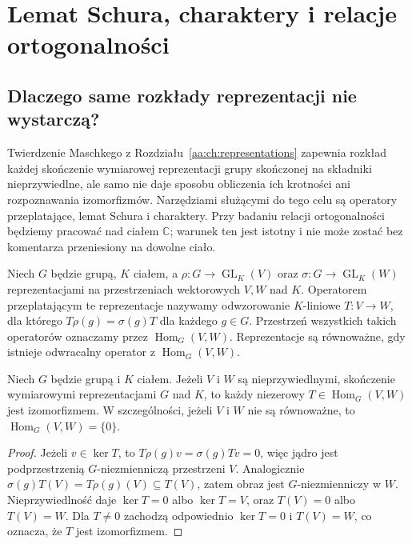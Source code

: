 \chapter{Lemat Schura, charaktery i relacje ortogonalności}

\providecommand{\atlasref}[2]{#2}

\label{aa:ch:schur-characters}

\section{Dlaczego same rozkłady reprezentacji nie wystarczą?}
Twierdzenie Maschkego z Rozdziału~\ref{aa:ch:representations}
zapewnia rozkład każdej skończenie wymiarowej reprezentacji
grupy skończonej na składniki nieprzywiedlne, ale samo nie daje
sposobu obliczenia ich krotności ani rozpoznawania izomorfizmów.
Narzędziami służącymi do tego celu są operatory przeplatające,
lemat Schura i charaktery. Przy badaniu relacji ortogonalności
będziemy pracować nad ciałem \(\mathbb C\); warunek ten
jest istotny i nie może zostać bez komentarza przeniesiony
na dowolne ciało.

\begin{definicja}
\label{aa:def:intertwiner}
Niech \(G\) będzie grupą, \(K\) ciałem, a
\(\rho:G\to\operatorname{GL}_K(V)\) oraz
\(\sigma:G\to\operatorname{GL}_K(W)\) reprezentacjami
na przestrzeniach wektorowych \(V,W\) nad \(K\).
Operatorem przeplatającym te reprezentacje nazywamy
odwzorowanie \(K\)-liniowe \(T:V\to W\), dla którego
\(T\rho(g)=\sigma(g)T\) dla każdego \(g\in G\).
Przestrzeń wszystkich takich operatorów oznaczamy przez
\(\operatorname{Hom}_G(V,W)\).
Reprezentacje są równoważne, gdy istnieje
odwracalny operator z \(\operatorname{Hom}_G(V,W)\).
\end{definicja}

\begin{lemat}\label{aa:lem:schur-first}
Niech \(G\) będzie grupą i \(K\) ciałem.
Jeżeli \(V\) i \(W\) są nieprzywiedlnymi, skończenie
wymiarowymi reprezentacjami \(G\) nad \(K\), to każdy
niezerowy \(T\in\operatorname{Hom}_G(V,W)\) jest izomorfizmem.
W szczególności, jeżeli \(V\) i \(W\) nie są równoważne,
to \(\operatorname{Hom}_G(V,W)=\{0\}\).
\end{lemat}
\begin{proof}
Jeżeli \(v\in\ker T\), to
\(T\rho(g)v=\sigma(g)Tv=0\), więc jądro jest
podprzestrzenią \(G\)-niezmienniczą przestrzeni \(V\).
Analogicznie \(\sigma(g)T(V)=T\rho(g)(V)\subseteq T(V)\),
zatem obraz jest \(G\)-niezmienniczy w \(W\).
Nieprzywiedlność daje \(\ker T=0\) albo \(\ker T=V\),
oraz \(T(V)=0\) albo \(T(V)=W\).
Dla \(T\ne0\) zachodzą odpowiednio \(\ker T=0\)
i \(T(V)=W\), co oznacza, że \(T\) jest izomorfizmem.
\end{proof}

